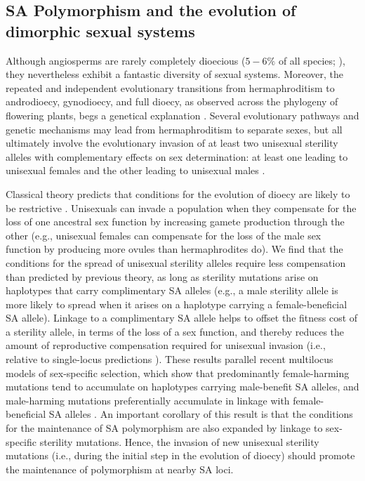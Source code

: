 \documentclass{article}
\begin{document}
\subsection*{SA Polymorphism and the evolution of dimorphic sexual systems}

Although angiosperms are rarely completely dioecious ($5-6\%$ of all species; \citealt{Renner2014}), they nevertheless exhibit a fantastic diversity of sexual systems. Moreover, the repeated and independent evolutionary transitions from hermaphroditism to androdioecy, gynodioecy, and full dioecy, as observed across the phylogeny of flowering plants, begs a genetical explanation \citep{Renner2014,KaferPannell2017}. Several evolutionary pathways and genetic mechanisms may lead from hermaphroditism to separate sexes, but all ultimately involve the evolutionary invasion of at least two unisexual sterility alleles with complementary effects on sex determination: at least one leading to unisexual females and the other leading to unisexual males \citep{Charlesworth1978a, Charlesworth1978b, Renner2014, Ashman2015}. 

Classical theory predicts that conditions for the evolution of dioecy are likely to be restrictive \citep{Lloyd1975,Lloyd1976,Charlesworth1978a,KaferPannell2017}. Unisexuals can invade a population when they compensate for the loss of one ancestral sex function by increasing gamete production through the other (e.g., unisexual females can compensate for the loss of the male sex function by producing more ovules than hermaphrodites do). We find that the conditions for the spread of unisexual sterility alleles require less compensation than predicted by previous theory, as long as sterility mutations arise on haplotypes that carry complimentary SA alleles (e.g., a male sterility allele is more likely to spread when it arises on a haplotype carrying a female-beneficial SA allele). Linkage to a complimentary SA allele helps to offset the fitness cost of a sterility allele, in terms of the loss of a sex function, and thereby reduces the amount of reproductive compensation required for unisexual invasion (i.e., relative to single-locus predictions \citealt{Charlesworth1978a}). These results parallel recent multilocus models of sex-specific selection, which show that predominantly female-harming mutations tend to accumulate on haplotypes carrying male-benefit SA alleles, and male-harming mutations preferentially accumulate in linkage with female-beneficial SA alleles \citep{ConnallonJordan2016, Patten2010, UbedaPatten2010, BlackburnOtto2010}. An important corollary of this result is that the conditions for the maintenance of SA polymorphism are also expanded by linkage to sex-specific sterility mutations. Hence, the invasion of new unisexual sterility mutations (i.e., during the initial step in the evolution of dioecy) should promote the maintenance of polymorphism at nearby SA loci. 
\end{document}
